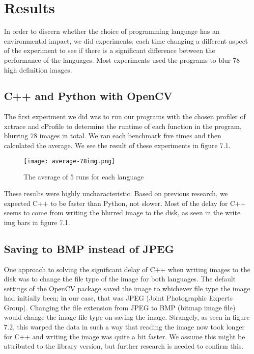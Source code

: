 \chapter{Results}
In order to discern whether the choice of programming language has an environmental impact, we did experiments, each time changing a different aspect of the experiment to see if there is a significant difference between the performance of the languages. Most experiments used the programs to blur 78 high definition images.

\section{C++ and Python with OpenCV }
The first experiment we did was to run our programs with the chosen profiler of xctrace and cProfile to determine the runtime of each function in the program, blurring 78 images in total. We ran each benchmark five times and then calculated the average. We see the result of these experiments in figure 7.1.

\begin{figure}[H]
	\centering
	\texttt{[image: average-78img.png]}
	\caption{The average of 5 runs for each language}
	\label{figure:average-78img}
\end{figure}

These results were highly uncharacteristic. Based on previous research, we expected C++ to be faster than Python, not slower. Most of the delay for C++ seems to come from writing the blurred image to the disk, as seen in the write img bars in figure 7.1.

\section{Saving to BMP instead of JPEG}
One approach to solving the significant delay of C++ when writing images to the disk was to change the file type of the image for both languages. The default settings of the OpenCV package saved the image to whichever file type the image had initially been; in our case, that was JPEG (Joint Photographic Experts Group). Changing the file extension from JPEG to BMP (bitmap image file) would change the image file type on saving the image. Strangely, as seen in figure 7.2, this warped the data in such a way that reading the image now took longer for C++ and writing the image was quite a bit faster. We assume this might be attributed to the library version, but further research is needed to confirm this.

